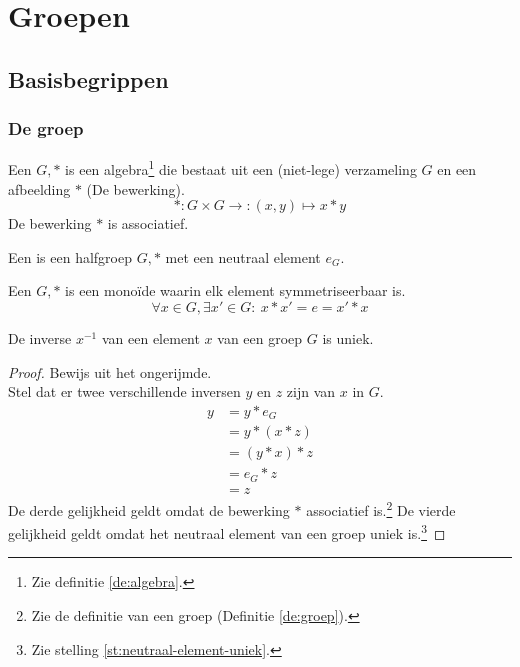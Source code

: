\documentclass[main.tex]{subfiles}
\begin{document}
\chapter{Groepen}
\label{cha:groepen}

\section{Basisbegrippen}
\label{sec:basisbegrippen}

\subsection{De groep}
\label{sec:de-groep}

\begin{de}
  Een  $G,*$ is een algebra\footnote{Zie definitie \ref{de:algebra}.} die bestaat uit een (niet-lege) verzameling $G$ en een afbeelding $*$ (De bewerking).
  \[ *: G \times G \rightarrow: (x,y) \mapsto x * y \]
  De bewerking $*$ is associatief.
\end{de}

\begin{de}
  Een  is een halfgroep $G,*$ met een neutraal element $e_{G}$.
\end{de}


\begin{de}
  \label{de:groep}
  Een  $G,*$ is een mono\"ide waarin elk element symmetriseerbaar is.
  \[ \forall x \in G, \exists x' \in G:\ x * x' = e = x' * x \]
\end{de}

\begin{st}
  \label{st:groep-uniek-invers-element}
  De inverse $x^{-1}$ van een element $x$ van een groep $G$ is uniek.
  
  \begin{proof}
    Bewijs uit het ongerijmde.\\
    Stel dat er twee verschillende inversen $y$ en $z$ zijn van $x$ in $G$.
    \[  
    \begin{array}{rl}
      y &= y * e_{G}\\
        &= y * (x * z)\\
        &= (y * x) * z\\
        &= e_{G} * z\\
        &= z
    \end{array}
    \]
    De derde gelijkheid geldt omdat de bewerking $*$ associatief is.\footnote{Zie de definitie van een groep (Definitie \ref{de:groep}).} De vierde gelijkheid geldt omdat het neutraal element van een groep uniek is.\footnote{Zie stelling \ref{st:neutraal-element-uniek}.}
  \end{proof}
\end{st}
\end{document}
